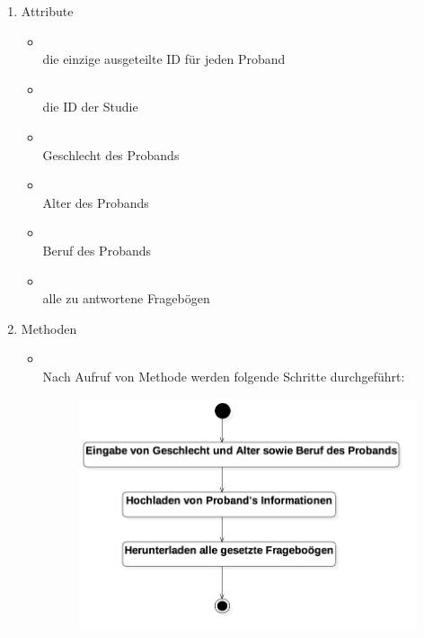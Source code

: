 \documentclass[a4paper]{scrreprt}
\begin{document}
{                    \begin{enumerate}
                        \item Attribute
                            \begin{itemize}
                                \item {\large {}}\\
                                    die einzige ausgeteilte ID für jeden Proband
                                \item {\large {}}\\
                                    die ID der Studie
                                \item {\large {}}\\
                                    Geschlecht des Probands
                                \item {\large {}}\\
                                    Alter des Probands
                                \item {\large {}}\\
                                    Beruf des Probands
                                \item {\large {}}\\
                                    alle zu antwortene Fragebögen
                            \end{itemize}

                        \item Methoden
                            \begin{itemize}
                                \item {\large {}}\\
                                    Nach Aufruf von Methode  werden folgende Schritte durchgeführt:
                                    \begin{figure}[H]
                                        \centering
                                        \includegraphics[scale = 0.5]{logIn.jpg}
                                        \caption{}
                                    \end{figure}


\end{itemize}
\end{enumerate}}
\end{document}
